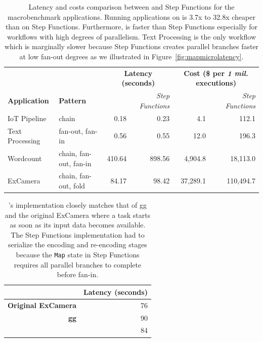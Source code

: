 \begin{table}[t]
  \centering
  \begin{tabular}{ll|rr|rr}
    \hline
    &                        & \multicolumn{2}{c}{\textbf{Latency (seconds)}}            & \multicolumn{2}{c}{\textbf{Cost (\$ per \emph{1 mil.} executions)}}       \\
    \textbf{Application} & \textbf{Pattern}       & \textit{\name{}} & \textit{Step Functions}   & \textit{\name{}} & \textit{Step Functions}            \\ \hline
    IoT Pipeline         & chain                  & 0.18       & 0.23       & 4.1       & 112.1   \\
    Text Processing      & fan-out, fan-in        & 0.56       & 0.55       & 12.0      & 196.3   \\
    Wordcount            & chain, fan-out, fan-in & 410.64     & 898.56     & 4,904.8   & 18,113.0 \\
    ExCamera             & chain, fan-out, fold   & 84.17      & 98.42      & 37,289.1   & 110,494.7      \\ \hline
  \end{tabular}
  \caption{Latency and costs comparison between \name{} and Step Functions for
    the macrobenchmark applications. Running applications on \name{} is 3.7x to
    32.8x cheaper than on Step Functions. Furthermore, \name{} is faster than Step
    Functions especially for workflows with high degrees of parallelism. Text
    Processing is the only workflow which \name{} is marginally slower because
    Step Functions creates parallel branches faster at low fan-out degrees as we
    illustrated in Figure~\ref{fig:mapmicrolatency}.}
  \label{table:macro}
\end{table}

\begin{table}[]
  \centering
  \begin{tabular}{|r|r|}
    \hline
    & \textbf{Latency (seconds)} \\ \hline
    \textbf{Original ExCamera}        & 76                         \\ \hline
    \textbf{gg}                       & 90                         \\ \hline
    \textbf{\name{}} & 84                         \\ \hline
  \end{tabular}
  \caption{\name{}'s implementation closely matches that of gg and the original
    ExCamera where a task starts as soon as its input data becomes available. The
    Step Functions implementation had to serialize the encoding and re-encoding
    stages because the \texttt{Map} state in Step Functions requires all parallel
    branches to complete before fan-in.}
  \label{table:excamera}
\end{table}

